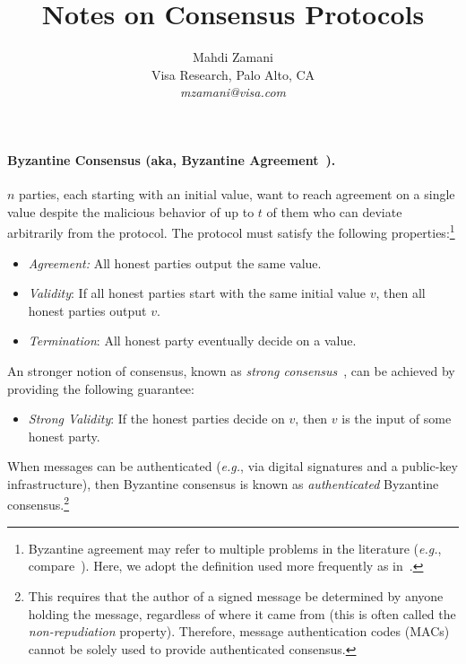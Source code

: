 \documentclass[11pt]{article}
\newcommand{\eg}{\textit{e.g.}}
\theoremstyle{mytheoremstyle}
\begin{document}
\title{Notes on Consensus Protocols}

\author{Mahdi Zamani\\ Visa Research, Palo Alto, CA \\ \textit{mzamani@visa.com}}
\date{}

\sloppy
\maketitle

\paragraph{Byzantine Consensus (aka, Byzantine Agreement~\cite{lsp82}).} $n$ parties, each starting with an initial value, want to reach agreement on a single value despite the malicious behavior of up to $t$ of them who can deviate arbitrarily from the protocol. The protocol must satisfy the following properties:\footnote{Byzantine agreement may refer to multiple problems in the literature (\eg, compare~\cite{dffls,lindell:2002:ba}). Here, we adopt the definition used more frequently as in~\cite{lindell:2002:ba,king:2016:bae:2906142.2837019,cryptoeprint:2018:754}.}
\begin{itemize}
	\item \emph{Agreement:} All honest parties output the same value.
	\item \emph{Validity}: If all honest parties start with the same initial value $v$, then all honest parties output $v$.
	\item \emph{Termination}: All honest party eventually decide on a value.
\end{itemize}
An stronger notion of consensus, known as \emph{strong consensus}~\cite{neiger94}, can be achieved by providing the following guarantee:
\begin{itemize}
	\item \emph{Strong Validity}: If the honest parties decide on $v$, then $v$ is the input of some honest party.
\end{itemize}
When messages can be authenticated (\eg, via digital signatures and a public-key infrastructure), then Byzantine consensus is known as \emph{authenticated} Byzantine consensus.\footnote{This requires that the author of a signed message be determined by anyone holding the message, regardless of where it came from (this is often called the \emph{non-repudiation} property). Therefore, message authentication codes (MACs) cannot be solely used to provide authenticated consensus.}
\end{document}
